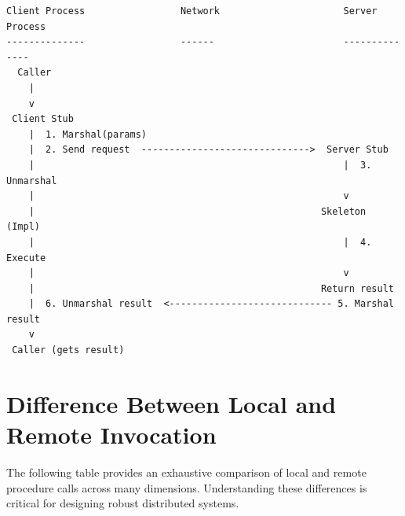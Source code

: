 \documentclass[10pt,a4paper]{article}
\begin{document}
\begin{verbatim}
Client Process                 Network                      Server Process
--------------                 ------                       --------------
  Caller
    |
    v
 Client Stub
    |  1. Marshal(params) 
    |  2. Send request  ------------------------------>  Server Stub
    |                                                       |  3. Unmarshal
    |                                                       v
    |                                                   Skeleton (Impl)
    |                                                       |  4. Execute
    |                                                       v
    |                                                   Return result
    |  6. Unmarshal result  <----------------------------- 5. Marshal result
    v
 Caller (gets result)
\end{verbatim}

\section{Difference Between Local and Remote Invocation}
The following table provides an exhaustive comparison of local and remote procedure calls across many dimensions. Understanding these differences is critical for designing robust distributed systems.
\end{document}
